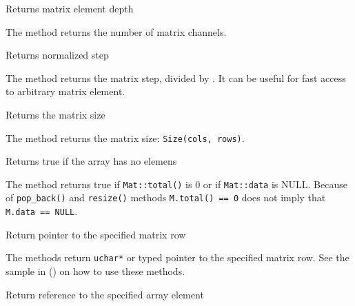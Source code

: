 Returns matrix element depth


The method returns the number of matrix channels.

Returns normalized step


The method returns the matrix step, divided by . It can be useful for fast access to arbitrary matrix element.

Returns the matrix size


The method returns the matrix size: \texttt{Size(cols, rows)}.

Returns true if the array has no elemens


The method returns true if \texttt{Mat::total()} is 0 or if \texttt{Mat::data} is NULL. Because of \texttt{pop\_back()} and \texttt{resize()} methods \texttt{M.total() == 0} does not imply that \texttt{M.data == NULL}.

Return pointer to the specified matrix row

\begin{description}
\end{description}

The methods return \texttt{uchar*} or typed pointer to the specified matrix row. See the sample in () on how to use these methods.

Return reference to the specified array element

